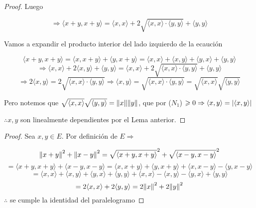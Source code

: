 \documentclass[12pt]{article}
\begin{document}
\begin{enumerate}[label=\textbf{\arabic*}.]
\begin{proof}
    Luego 

    \begin{equation*}
        \Rightarrow \langle x+y, x+y \rangle = \langle x,x \rangle + 2\sqrt{\langle x,x \rangle \cdot \langle y,y \rangle} + \langle y,y \rangle
    \end{equation*}

    Vamos a expandir el producto interior del lado izquierdo de la ecaución

    \begin{equation*}
        \langle x+y, x+y \rangle = \langle x, x+y \rangle + \langle y, x+y \rangle = \langle x, x\rangle + \langle x, y\rangle + \langle y, x\rangle  + \langle y,y \rangle 
    \end{equation*}
    \begin{equation*}
        \Rightarrow \langle x, x\rangle + 2 \langle x, y\rangle + \langle y,y \rangle =  \langle x,x \rangle + 2\sqrt{\langle x,x \rangle \cdot \langle y,y \rangle} + \langle y,y \rangle
    \end{equation*}
    \begin{equation*}
        \Rightarrow 2 \langle x, y\rangle  = 2\sqrt{\langle x,x \rangle \cdot \langle y,y \rangle} \Rightarrow  \langle x, y\rangle  = \sqrt{\langle x,x \rangle \cdot \langle y,y \rangle} = \sqrt{\langle x,x \rangle } \sqrt{\langle y,y \rangle}
    \end{equation*}

    Pero notemos que $\sqrt{\langle x,x \rangle } \sqrt{\langle y,y \rangle} = \norm{x} \norm{y}$, que por ($N_1$)  $\geqslant 0 \Rightarrow \langle x, y\rangle = \abs{\langle x, y\rangle}$

    $\therefore x, y $ son linealmente dependientes por el Lema anterior.
\end{proof}

\begin{proof}
    Sea $x, y \in E$. Por definición de $E \Rightarrow$

    \begin{equation*}
       {\norm{x+y}}^{2} + {\norm{x-y}}^{2} =  {\sqrt{\langle x + y , x + y \rangle}}^{2}+ {\sqrt{\langle x - y , x - y \rangle}}^{2}
    \end{equation*}
    \begin{equation*}
        = \langle x + y , x + y \rangle + \langle x - y , x - y \rangle = \langle x , x + y \rangle + \langle y , x + y \rangle + \langle x  , x - y \rangle - \langle y , x - y \rangle
    \end{equation*}
    \begin{equation*}
        = \langle x , x  \rangle + \langle x , y \rangle+ \langle y , x \rangle + \langle y ,y \rangle + \langle x  , x \rangle - \langle x  , y \rangle - \langle y , x \rangle + \langle y , y \rangle
    \end{equation*}
    \begin{equation*}
        = 2 \langle x  , x \rangle + 2 \langle y, y \rangle = 2 {\norm{x}}^{2} + 2 {\norm{y}}^{2}
    \end{equation*}
    $\therefore$ se cumple la identidad del paralelogramo
\end{proof}


\end{enumerate}
\end{document}
